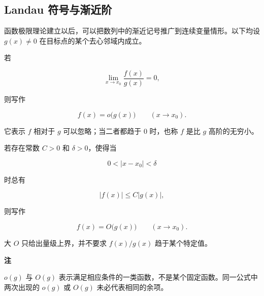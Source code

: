 \documentclass[fontset=fandol]{ctexart}
\newenvironment{remark}{\par\noindent\textbf{注}\quad}{\par\vspace{0.8em}}
\begin{document}
\iffalse

\subsection{Landau 符号与渐近阶}



函数极限理论建立以后，可以把数列中的渐近记号推广到连续变量情形。以下均设 \(g(x)\neq0\) 在目标点的某个去心邻域内成立。



\begin{definition}[函数的小 \(o\) 记号]

若

\[

\lim_{x\to x_0}\frac{f(x)}{g(x)}=0,

\]

则写作

\[

f(x)=o\bigl(g(x)\bigr)\qquad(x\to x_0).

\]

它表示 \(f\) 相对于 \(g\) 可以忽略；当二者都趋于 \(0\) 时，也称 \(f\) 是比 \(g\) 高阶的无穷小。

\end{definition}



\begin{definition}[函数的大 \(O\) 记号]

若存在常数 \(C>0\) 和 \(\delta>0\)，使得当

\[

0<|x-x_0|<\delta

\]

时总有

\[

|f(x)|\le C|g(x)|,

\]

则写作

\[

f(x)=O\bigl(g(x)\bigr)\qquad(x\to x_0).

\]

大 \(O\) 只给出量级上界，并不要求 \(f(x)/g(x)\) 趋于某个特定值。

\end{definition}



\begin{remark}

\(o(g)\) 与 \(O(g)\) 表示满足相应条件的一类函数，不是某个固定函数。同一公式中两次出现的 \(o(g)\) 或 \(O(g)\) 未必代表相同的余项。

\end{remark}
\end{document}
